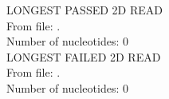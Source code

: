 
LONGEST PASSED 2D READ\\
From file: .\\
Number of nucleotides: 0\\

LONGEST FAILED 2D READ\\
From file: .\\
Number of nucleotides: 0\\
